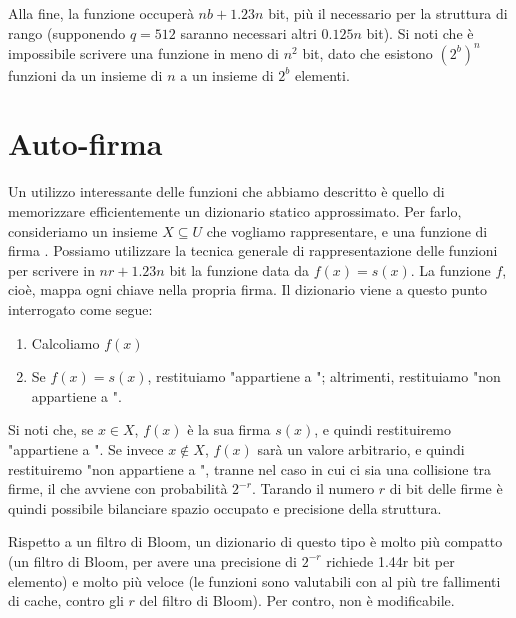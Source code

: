 Alla fine, la funzione occuperà $nb + 1.23n$ bit, più il necessario per la struttura di rango (supponendo $q = 512$ saranno necessari altri $0.125n$ bit). Si noti che è impossibile scrivere una funzione in meno di $n^2$ bit, dato che esistono $(2^b)^n$ funzioni da un insieme di $n$ a un insieme di $2^b$ elementi.
\section{Auto-firma}
Un utilizzo interessante delle funzioni che abbiamo descritto è quello di memorizzare efficientemente un dizionario statico approssimato. Per farlo, consideriamo un insieme $X \subseteq U$ che vogliamo rappresentare, e una funzione di firma .
Possiamo utilizzare la tecnica generale di rappresentazione delle funzioni per scrivere in $nr + 1.23n$ bit la funzione  data da $f(x) = s(x)$. La funzione $f$, cioè, mappa ogni chiave nella propria firma. Il dizionario viene a questo punto interrogato come segue:
\begin{enumerate}
    \item Calcoliamo $f(x)$
    \item Se $f(x) = s(x)$, restituiamo "appartiene a "; altrimenti, restituiamo "non appartiene a ".
\end{enumerate}
Si noti che, se $x \in X$, $f(x)$ è la sua firma $s(x)$, e quindi restituiremo "appartiene a ". Se invece $x \notin X$, $f(x)$ sarà un valore arbitrario, e quindi restituiremo "non appartiene a ", tranne nel caso in cui ci sia una collisione tra firme, il che avviene con probabilità $2^{-r}$. Tarando il numero $r$ di bit delle firme è quindi possibile bilanciare spazio occupato e precisione della struttura.

Rispetto a un filtro di Bloom, un dizionario di questo tipo è molto più compatto (un filtro di Bloom, per avere una precisione di $2^{-r}$ richiede 1.44r bit per elemento) e molto più veloce (le funzioni sono valutabili con al più tre fallimenti di cache, contro gli $r$ del filtro di Bloom). Per contro, non è modificabile.
